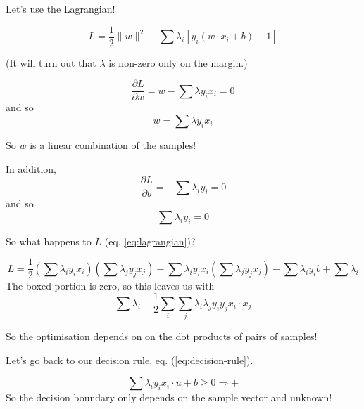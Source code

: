 Let's use the Lagrangian!

\begin{equation}
  \label{eq:lagrangian}
  L = \frac 12 \parallel w\parallel^2 - \sum \lambda_i \left[ y_i(w\cdot
    x_i + b) - 1 \right]
\end{equation}

(It will turn out that $\lambda$ is non-zero only on the margin.)

\begin{displaymath}
  \frac{\partial L}{\partial w} = w - \sum\lambda y_i x_i = 0
\end{displaymath}
and so
\begin{equation}
  \label{eq:w}
  w = \sum\lambda y_i x_i
\end{equation}

So $w$ is a linear combination of the samples!

In addition,
\begin{displaymath}
  \frac{\partial L}{\partial b} = -\sum \lambda_i y_i = 0
\end{displaymath}
and so
\begin{equation}
  \label{eq:b}
  \sum \lambda_i y_i = 0
\end{equation}

So what happens to $L$ (eq. \ref{eq:lagrangian})?

\bigskip

\begin{equation}
  \label{eq:learning-rule}
  L = \frac 12 \left( \sum \lambda_i y_i x_i\right)
  \left(\sum \lambda_j y_j x_j\right)
  -
  \sum \lambda_i y_i x_i
  \left(\sum \lambda_j y_j x_j\right)
  - \boxed{\sum \lambda_i y_i} b + \sum \lambda_i
\end{equation}
The boxed portion is zero, so this leaves us with
\begin{equation}
  \label{eq:recognition-rule}
  \sum\lambda_i - \frac 12 \sum_i \sum_j \lambda_i \lambda_j y_i y_j
  x_i\cdot x_j
\end{equation}

So the optimisation depends on on the dot products of pairs of
samples!

\bigskip

Let's go back to our decision rule, eq. (\ref{eq:decision-rule}).

\begin{displaymath}
  \sum \lambda_i y_i x_i\cdot u + b \ge 0 \Rightarrow +
\end{displaymath}
So the decision boundary only depends on the sample vector and unknown!

